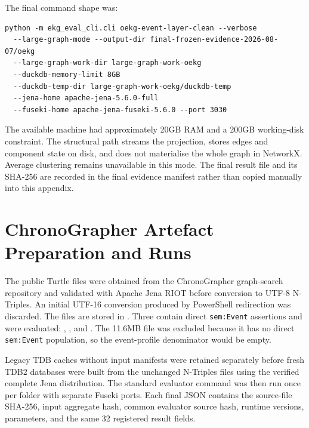 The final command shape was:

\begin{verbatim}
python -m ekg_eval_cli.cli oekg-event-layer-clean --verbose
  --large-graph-mode --output-dir final-frozen-evidence-2026-08-07/oekg
  --large-graph-work-dir large-graph-work-oekg
  --duckdb-memory-limit 8GB
  --duckdb-temp-dir large-graph-work-oekg/duckdb-temp
  --jena-home apache-jena-5.6.0-full
  --fuseki-home apache-jena-fuseki-5.6.0 --port 3030
\end{verbatim}

The available machine had approximately 20GB RAM and a 200GB working-disk constraint. The structural path streams the projection, stores edges and component state on disk, and does not materialise the whole graph in NetworkX. Average clustering remains unavailable in this mode. The final result file and its SHA-256 are recorded in the final evidence manifest rather than copied manually into this appendix.

\section{ChronoGrapher Artefact Preparation and Runs}

The public Turtle files were obtained from the ChronoGrapher graph-search repository and validated with Apache Jena RIOT before conversion to UTF-8 N-Triples. An initial UTF-16 conversion produced by PowerShell redirection was discarded. The files are stored in . Three contain direct \texttt{sem:Event} assertions and were evaluated: , , and . The 11.6MB  file was excluded because it has no direct \texttt{sem:Event} population, so the event-profile denominator would be empty.

Legacy TDB caches without input manifests were retained separately before fresh TDB2 databases were built from the unchanged N-Triples files using the verified complete Jena distribution. The standard evaluator command was then run once per folder with separate Fuseki ports. Each final JSON contains the source-file SHA-256, input aggregate hash, common evaluator source hash, runtime versions, parameters, and the same 32 registered result fields.
